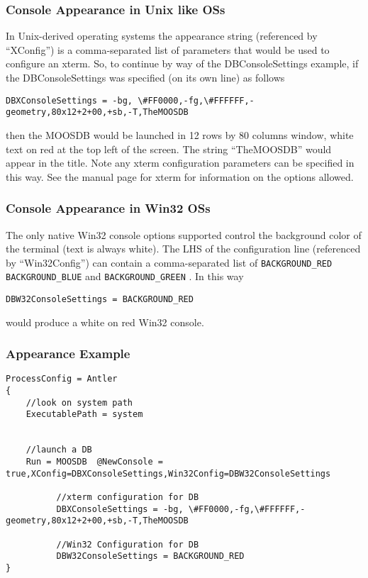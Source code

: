 \documentclass[a4paper,10pt]{article}
\newcommand{\Code}[1]{\texttt{#1} }
\newcommand{\code}[1]{\Code{#1} }
\begin{document}
\subsubsection{Console Appearance in Unix like OSs}

In Unix-derived operating systems the appearance string (referenced by ``XConfig'') is a comma-separated list of parameters that would be used to configure an xterm. So, to continue by way of the DBConsoleSettings example, if the DBConsoleSettings was specified (on its own line) as follows
\begin{lstlisting}
DBXConsoleSettings = -bg, \#FF0000,-fg,\#FFFFFF,-geometry,80x12+2+00,+sb,-T,TheMOOSDB
\end{lstlisting}
then the MOOSDB would be  launched in 12 rows by 80 columns window, white text on red at the top left of the screen. The string ``TheMOOSDB'' would appear in the title. Note any xterm configuration parameters can be specified in this way. See the manual page for xterm for information on the options allowed.

\subsubsection{Console Appearance in Win32 OSs}
The only native Win32 console options supported control the background color of the terminal (text is always white). The LHS of the configuration line (referenced by ``Win32Config'')  can contain a comma-separated list of \code{BACKGROUND\_RED} \code{BACKGROUND\_BLUE}  and \code{BACKGROUND\_GREEN}. In this way
\begin{lstlisting}
DBW32ConsoleSettings = BACKGROUND_RED
\end{lstlisting}
would produce a white on red Win32 console.

\subsubsection{Appearance Example}

\begin{lstlisting}
ProcessConfig = Antler
{
	//look on system path
	ExecutablePath = system


	//launch a DB
	Run = MOOSDB  @NewConsole = true,XConfig=DBXConsoleSettings,Win32Config=DBW32ConsoleSettings
	
          //xterm configuration for DB
          DBXConsoleSettings = -bg, \#FF0000,-fg,\#FFFFFF,-geometry,80x12+2+00,+sb,-T,TheMOOSDB

          //Win32 Configuration for DB
          DBW32ConsoleSettings = BACKGROUND_RED	
}
\end{lstlisting}
\end{document}

